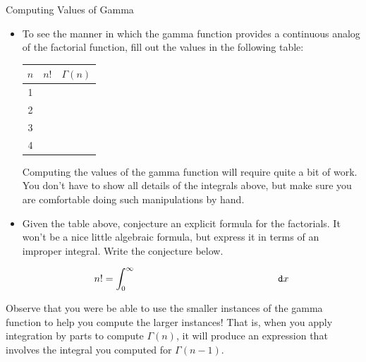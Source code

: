\begin{exercise}{Computing Values of Gamma \Coffeecup \Coffeecup \Coffeecup}
 \begin{itemize}
 \item 
 To see the manner in which the gamma function provides a continuous analog of the factorial function, fill out the values in the following table:
 
 \begin{center}
  \begin{tabular}{|| c || c | c ||}
    \hline 
    $n$ & $n!$ & $\Gamma(n)$  \\  \hline 
    1 &  &   \\ \hline
    2 &  &   \\ \hline
    3 &  &   \\ \hline
    4 &  &   \\ \hline
 \end{tabular}
\end{center}


 Computing the values of the gamma function will require quite a bit of work.  You don't have to show all details of the integrals above, but make sure you are comfortable doing such manipulations by hand. 
\item Given the table above, conjecture an explicit formula for the factorials.  It won't be a nice little algebraic formula, but express it in terms of an improper integral.  Write the conjecture below.

$$n!=\int_{0}^\infty \hspace*{2in} \mathop{}\!\mathtt{d} x $$


\end{itemize}
\end{exercise}

Observe that you were be able to use the smaller instances of the gamma function to help you compute the larger instances!  That is, when you apply integration by parts to compute $\Gamma(n)$, it will produce an expression that involves the integral you computed for $\Gamma(n-1)$.
 
